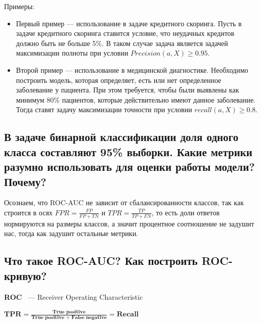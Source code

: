 Примеры:

\begin{itemize}
    \item Первый пример — использование в задаче кредитного скоринга. Пусть в задаче кредитного скоринга ставится условие, что неудачных кредитов должно быть не больше 5\%. В таком случае задача является задачей максимизации полноты при условии $Precision(a,X) \ge 0.95$.
    \item Второй пример — использование в медицинской диагностике. Необходимо построить модель, которая определяет, есть или нет определенное заболевание у пациента. При этом требуется, чтобы были выявлены как минимум 80\% пациентов, которые действительно имеют данное заболевание. Тогда ставят задачу максимизации точности при условии $recall(a,X) \ge 0.8$.
\end{itemize}











\subsection{В задаче бинарной классификации доля одного класса составляют 95\% выборки. Какие
метрики разумно использовать для оценки работы модели? Почему?}

Осознаем, что ROC-AUC не зависит от сбалансированности классов, так как строится в осях $FPR = \frac{FP}{FP + TN}$ и $TPR = \frac{TP}{TP + FN}$, то есть доли ответов нормируются на размеры классов, а значит процентное соотношение не задушит нас, тогда как задушит остальные метрики.






\subsection{Что такое ROC-AUC? Как построить ROC-кривую?}

\begin{definition}
    \textbf{ROC} ~--- Receiver Operating Characteristic
\end{definition}

\begin{definition}
    $\textbf{TPR} = \frac{\textbf{True positive}}{\textbf{True positive + False negative}} = \textbf{Recall}$
\end{definition}

